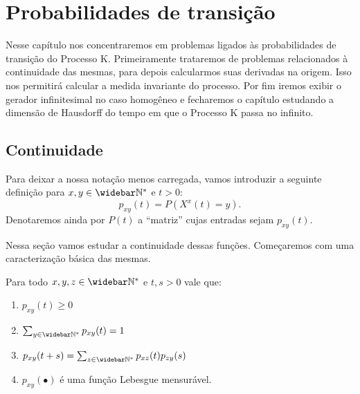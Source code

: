 \chapter{Probabilidades de transição}
\label{cap:taxas}

Nesse capítulo nos concentraremos em problemas ligados às
probabilidades de transição do Processo K. Primeiramente trataremos
de problemas relacionados à continuidade das mesmas, para depois
calcularmos suas derivadas na origem. Isso nos permitirá calcular a
medida invariante do processo.  Por fim iremos exibir o gerador
infinitesimal no caso homogêneo e fecharemos o capítulo estudando a
dimensão de Hausdorff do tempo em que o Processo K passa no infinito.



\section{Continuidade}
\label{sec:continuidade}

Para deixar a nossa notação menos carregada, vamos introduzir a
seguinte definição para $x, y \in \Nzb$ e $t > 0$:
\begin{equation}
  p_{xy} (t) = P(X^x(t) = y).
\end{equation}
Denotaremos ainda por $P(t)$ a ``matriz'' cujas entradas sejam $p_{xy}(t)$.

Nessa seção vamos estudar a continuidade dessas funções. Começaremos
com uma caracterização básica das mesmas.

\begin{proposicao}
  \label{prop:transicao-mensuravel}
  Para todo $x, y, z \in \Nzb$ e $t, s > 0$ vale que:
  \begin{enumerate}
  \item $p_{xy}(t) \geq 0$
  \item $\sum_{y \in \Nzb} p_{xy}(t) = 1$
  \item $p_{xy}(t+s) = \sum_{z\in\Nzb}p_{xz}(t)p_{zy}(s)$
  \item $p_{xy}(\bullet)$ é uma função Lebesgue mensurável.
  \end{enumerate}
\end{proposicao}

